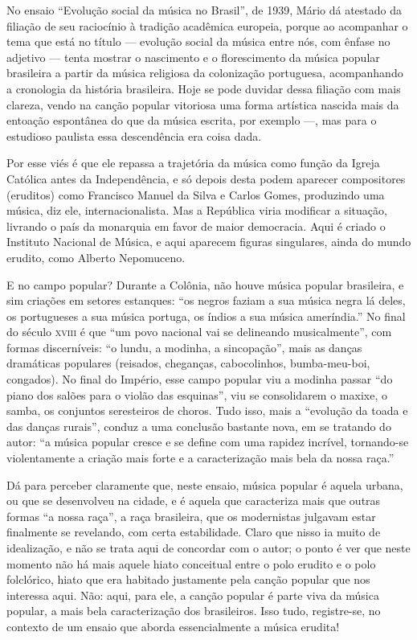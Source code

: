 No ensaio ``Evolução social da música no Brasil'', de 1939, Mário dá
atestado da filiação de seu raciocínio à tradição acadêmica europeia,
porque ao acompanhar o tema que está no título --- evolução social
da música entre nós, com ênfase no adjetivo --- tenta mostrar o
nascimento e o florescimento da música popular brasileira a partir da
música religiosa da colonização portuguesa, acompanhando a cronologia da
história brasileira. Hoje se pode duvidar dessa filiação com mais
clareza, vendo na canção popular vitoriosa uma forma artística nascida
mais da entoação espontânea do que da música escrita, por exemplo ---,
mas para o estudioso paulista essa descendência era coisa dada.

Por esse viés é que ele repassa a trajetória da música como função da
Igreja Católica antes da Independência, e só depois desta podem aparecer
compositores (eruditos) como Francisco Manuel da Silva e Carlos Gomes,
produzindo uma música, diz ele, internacionalista. Mas a República viria
modificar a situação, livrando o país da monarquia em favor de maior
democracia. Aqui é criado o Instituto Nacional de Música, e aqui
aparecem figuras singulares, ainda do mundo erudito, como Alberto
Nepomuceno.

E no campo popular? Durante a Colônia, não houve música popular
brasileira, e sim criações em setores estanques: ``os negros faziam a
sua música negra lá deles, os portugueses a sua música portuga, os
índios a sua música ameríndia.'' No final do século \textsc{xviii} é que ``um povo
nacional vai se delineando musicalmente'', com formas discerníveis: ``o
lundu, a modinha, a sincopação'', mais as danças dramáticas populares
(reisados, cheganças, cabocolinhos, bumba-meu-boi, congados). No final
do Império, esse campo popular viu a modinha passar ``do piano dos
salões para o violão das esquinas'', viu se consolidarem o maxixe, o
samba, os conjuntos seresteiros de choros. Tudo isso, mais a ``evolução
da toada e das danças rurais'', conduz a uma conclusão bastante nova, em
se tratando do autor: ``a música popular cresce e se define com uma
rapidez incrível, tornando-se violentamente a criação mais forte e a
caracterização mais bela da nossa raça.''

Dá para perceber claramente que, neste ensaio, música popular é
aquela urbana, ou que se desenvolveu na cidade, e é aquela que
caracteriza mais que outras formas ``a nossa raça'', a raça brasileira,
que os modernistas julgavam estar finalmente se revelando, com certa
estabilidade. Claro que nisso ia muito de idealização, e não se trata
aqui de concordar com o autor; o ponto é ver que neste momento não há
mais aquele hiato conceitual entre o polo erudito e o polo folclórico,
hiato que era habitado justamente pela canção popular que nos interessa
aqui. Não: aqui, para ele, a canção popular é parte viva da música
popular, a mais bela caracterização dos brasileiros. Isso tudo,
registre-se, no contexto de um ensaio que aborda essencialmente a música
erudita!

